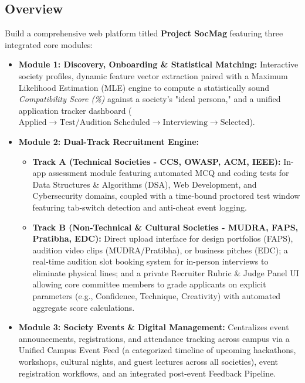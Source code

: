 \documentclass[11pt,a4paper]{article}
\begin{document}
\subsection{Overview}
Build a comprehensive web platform titled \textbf{Project SocMag} featuring three integrated core modules:
\begin{itemize}[leftmargin=0.7cm]
    \item \textbf{Module 1: Discovery, Onboarding \& Statistical Matching:} Interactive society profiles, dynamic feature vector extraction paired with a Maximum Likelihood Estimation (MLE) engine to compute a statistically sound \emph{Compatibility Score (\%)} against a society's "ideal persona," and a unified application tracker dashboard ($\text{Applied} \rightarrow \text{Test/Audition Scheduled} \rightarrow \text{Interviewing} \rightarrow \text{Selected}$).
    \item \textbf{Module 2: Dual-Track Recruitment Engine:}
    \begin{itemize}
        \item \textbf{Track A (Technical Societies - CCS, OWASP, ACM, IEEE):} In-app assessment module featuring automated MCQ and coding tests for Data Structures \& Algorithms (DSA), Web Development, and Cybersecurity domains, coupled with a time-bound proctored test window featuring tab-switch detection and anti-cheat event logging.
        \item \textbf{Track B (Non-Technical \& Cultural Societies - MUDRA, FAPS, Pratibha, EDC):} Direct upload interface for design portfolios (FAPS), audition video clips (MUDRA/Pratibha), or business pitches (EDC); a real-time audition slot booking system for in-person interviews to eliminate physical lines; and a private Recruiter Rubric \& Judge Panel UI allowing core committee members to grade applicants on explicit parameters (e.g., Confidence, Technique, Creativity) with automated aggregate score calculations.
    \end{itemize}
    \item \textbf{Module 3: Society Events \& Digital Management:} Centralizes event announcements, registrations, and attendance tracking across campus via a Unified Campus Event Feed (a categorized timeline of upcoming hackathons, workshops, cultural nights, and guest lectures across all societies), event registration workflows, and an integrated post-event Feedback Pipeline.
\end{itemize}
\end{document}
